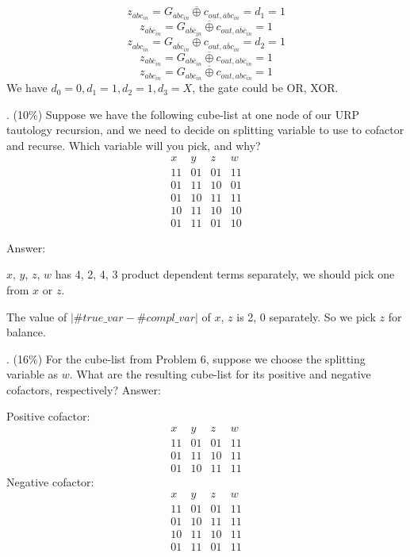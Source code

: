 \documentclass[12pt]{article}
\begin{document}
    \[
        z_{\overline a b c_{in}} =
        G_{\overline a b c_{in}} \overline \oplus
        c_{out,\overline a b c_{in}} = d_1 = 1
    \]
    \[
        z_{a \overline b \overline c_{in}} =
        G_{a \overline b \overline c_{in}} \overline \oplus
        c_{out,a \overline b \overline c_{in}} = 1
    \]
    \[
        z_{a \overline b c_{in}} =
        G_{a \overline b c_{in}} \overline \oplus
        c_{out,a \overline b c_{in}} = d_2 = 1
    \]
    \[
        z_{a b \overline c_{in}} =
        G_{a b \overline c_{in}} \overline \oplus
        c_{out,a b \overline c_{in}} = 1
    \]
    \[
        z_{a b c_{in}} =
        G_{a b c_{in}} \overline \oplus
        c_{out,a b c_{in}} = 1
    \]
    We have $d_0 = 0, d_1 = 1, d_2 = 1, d_3 = X$, the gate could be OR, XOR.

    \vspace{12pt}
    . (10\%) Suppose we have the following cube-list at one node of our URP tautology
    recursion, and we need to decide on splitting variable to use to cofactor and recurse.
    Which variable will you pick, and why?
    \[
        \begin{matrix}
            x & y & z & w \\
            11 & 01 & 01 & 11 \\
            01 & 11 & 10 & 01 \\
            01 & 10 & 11 & 11 \\
            10 & 11 & 10 & 10 \\
            01 & 11 & 01 & 10
        \end{matrix}
    \]

    \noindent
    Answer:

    \noindent
    $x$, $y$, $z$, $w$ has 4, 2, 4, 3 product dependent terms separately, we should pick one
    from $x$ or $z$.

    \noindent
    The value of $|\#true\_var - \#compl\_var|$ of $x$, $z$ is 2, 0 separately. So we pick $z$
    for balance.

    \vspace{12pt}
    . (16\%) For the cube-list from Problem 6, suppose we choose the splitting variable as
    $w$. What are the resulting cube-list for its positive and negative cofactors,
    respectively?
    \noindent
    Answer:

    \noindent
    Positive cofactor:
    \[
        \begin{matrix}
            x & y & z & w \\
            11 & 01 & 01 & 11 \\
            01 & 11 & 10 & 11 \\
            01 & 10 & 11 & 11
        \end{matrix}
    \]
    Negative cofactor:
    \[
        \begin{matrix}
            x & y & z & w \\
            11 & 01 & 01 & 11 \\
            01 & 10 & 11 & 11 \\
            10 & 11 & 10 & 11 \\
            01 & 11 & 01 & 11
        \end{matrix}
    \]
\end{document}
